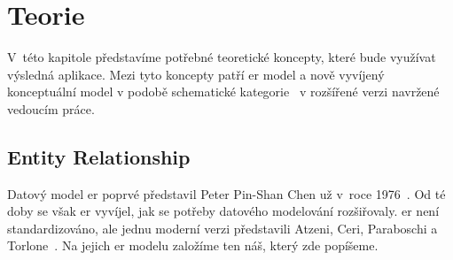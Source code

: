 \chapter{Teorie}

V~této kapitole představíme potřebné teoretické koncepty, které bude využívat výsledná aplikace.
Mezi tyto koncepty patří \acrfull{er} model a nově vyvíjený konceptuální model v podobě schematické kategorie~\cite{svoboda_categorical_2021} v rozšířené verzi navržené vedoucím práce.

\section{Entity Relationship}\label{section:entity-relationship}

Datový model \acrfull{er} poprvé představil Peter Pin-Shan Chen už v~roce 1976~\cite{chen_er_1976}.
Od té doby se však \acrshort{er} vyvíjel, jak se potřeby datového modelování rozšiřovaly.
\acrshort{er} není standardizováno, ale jednu moderní verzi představili Atzeni, Ceri, Paraboschi a Torlone~\cite[s.~163-179]{atzeni_database_1999}.
Na jejich \acrshort{er} modelu založíme ten náš, který zde popíšeme.

